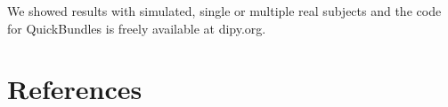 \documentclass[preprint,authoryear,a4paper,10pt,onecolumn]{elsarticle}
\begin{document}
We showed results with simulated, single or multiple real subjects
and the code for QuickBundles is freely available at dipy.org.

\section{References}

%





\end{document}
